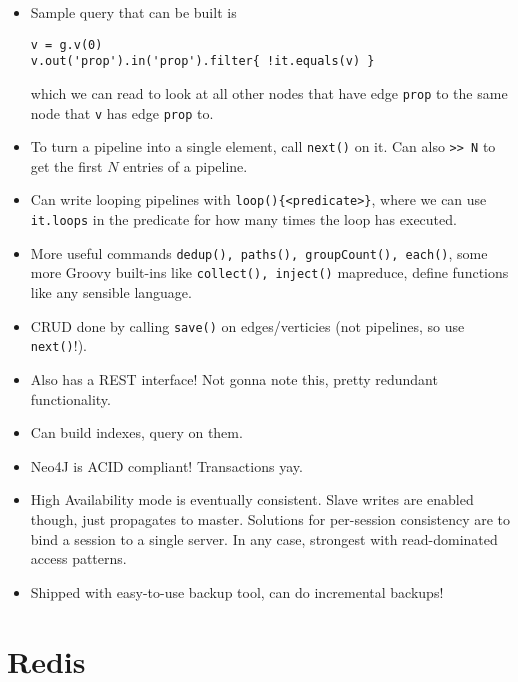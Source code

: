 \documentclass[10pt]{article}
\begin{document}
\begin{itemize}
    \item Sample query that can be built is
\begin{lstlisting}
v = g.v(0)
v.out('prop').in('prop').filter{ !it.equals(v) }
\end{lstlisting}
        which we can read to look at all other nodes that have edge
        \lstinline{prop} to the same node that \lstinline{v} has edge
        \lstinline{prop} to.
    \item To turn a pipeline into a single element, call \lstinline{next()} on
        it. Can also \lstinline{>> N} to get the first $N$ entries of a
        pipeline.
    \item Can write looping pipelines with \lstinline$loop(){<predicate>}$,
        where we can use \lstinline{it.loops} in the predicate for how many
        times the loop has executed.
    \item More useful commands
        \lstinline{dedup(), paths(), groupCount(), each()}, some more Groovy
        built-ins like \lstinline{collect(), inject()} mapreduce, define
        functions like any sensible language.
    \item CRUD done by calling \lstinline{save()} on edges/verticies (not
        pipelines, so use \lstinline{next()}!).
    \item Also has a REST interface! Not gonna note this, pretty redundant
        functionality.
    \item Can build indexes, query on them.
    \item Neo4J is ACID compliant! Transactions yay.
    \item High Availability mode is eventually consistent. Slave writes are
        enabled though, just propagates to master. Solutions for per-session
        consistency are to bind a session to a single server. In any case,
        strongest with read-dominated access patterns.
    \item Shipped with easy-to-use backup tool, can do incremental backups!
\end{itemize}

\section{Redis}
\end{document}
